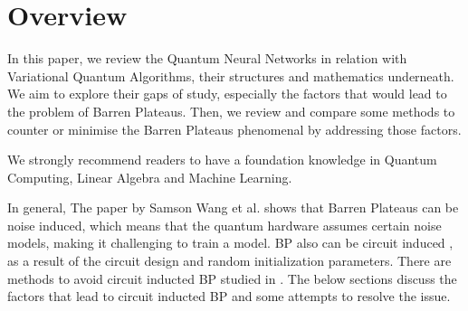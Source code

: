 \section{Overview}
In this paper, we review the Quantum Neural Networks in relation with Variational Quantum Algorithms, their structures and mathematics underneath. 
We aim to explore their gaps of study, especially the factors that would lead to the problem of Barren Plateaus.
Then, we review and compare some methods to counter or minimise the Barren Plateaus phenomenal by addressing those factors.

We strongly recommend readers to have a foundation knowledge in Quantum Computing, Linear Algebra and Machine Learning.

In general, The paper \cite{wangNoiseinducedBarrenPlateaus2021} by Samson Wang et al. shows that Barren Plateaus can be noise induced, which means that the quantum hardware assumes certain noise models, making it challenging to train a model. 
BP also can be circuit induced \cite{mccleanBarrenPlateausQuantum2018}, as a result of the circuit design and random initialization parameters.
There are methods to avoid circuit inducted BP studied in \cite{pesahAbsenceBarrenPlateaus2021, cerezoCostFunctionDependent2021,skolikLayerwiseLearningQuantum2021}.
The below sections discuss the factors that lead to circuit inducted BP and some attempts to resolve the issue.